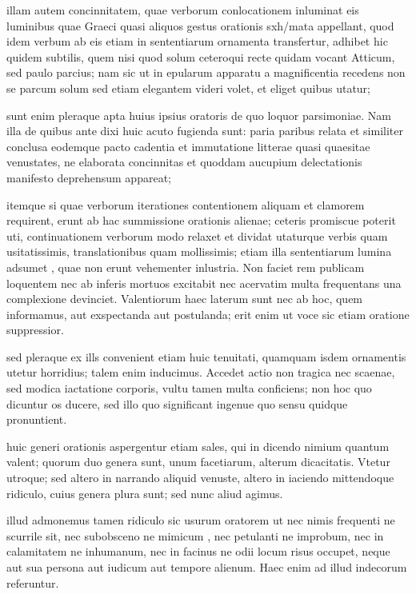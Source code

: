  illam autem concinnitatem, quae verborum conlocationem inluminat eis luminibus quae Graeci quasi aliquos gestus orationis sxh/mata appellant, quod idem verbum ab eis etiam in sententiarum ornamenta transfertur, adhibet hic quidem subtilis, quem nisi quod solum ceteroqui recte quidam vocant Atticum, sed paulo parcius; nam sic ut in epularum apparatu a magnificentia recedens non se parcum solum sed etiam elegantem videri volet, et eliget quibus utatur;

 sunt enim pleraque apta huius ipsius oratoris de quo loquor parsimoniae. Nam illa de quibus ante dixi huic acuto fugienda sunt: paria paribus relata et similiter conclusa eodemque pacto cadentia et immutatione litterae quasi quaesitae venustates, ne elaborata concinnitas et quoddam aucupium delectationis manifesto deprehensum appareat;

 itemque si quae verborum iterationes contentionem aliquam et clamorem requirent, erunt ab hac summissione orationis alienae; ceteris promiscue poterit uti, continuationem verborum modo relaxet et dividat utaturque verbis quam usitatissimis, translationibus quam mollissimis; etiam illa sententiarum lumina adsumet , quae non erunt vehementer inlustria. Non faciet rem publicam loquentem nec ab inferis mortuos excitabit nec acervatim multa frequentans una complexione devinciet. Valentiorum haec laterum sunt nec ab hoc, quem informamus, aut exspectanda aut postulanda; erit enim ut voce sic etiam oratione suppressior.

 sed pleraque ex ills convenient etiam huic tenuitati, quamquam isdem ornamentis utetur horridius; talem enim inducimus. Accedet actio non tragica nec scaenae, sed modica iactatione corporis, vultu tamen multa conficiens; non hoc quo dicuntur os ducere, sed illo quo significant ingenue quo sensu quidque pronuntient.

 huic generi orationis aspergentur etiam sales, qui in dicendo nimium quantum valent; quorum duo genera sunt, unum facetiarum, alterum dicacitatis. Vtetur utroque; sed altero in narrando aliquid venuste, altero in iaciendo mittendoque ridiculo, cuius genera plura sunt; sed nunc aliud agimus.

 illud admonemus tamen ridiculo sic usurum oratorem ut nec nimis frequenti ne scurrile sit, nec subobsceno ne mimicum , nec petulanti ne improbum, nec in calamitatem ne inhumanum, nec in facinus ne odii locum risus occupet, neque aut sua persona aut iudicum aut tempore alienum. Haec enim ad illud indecorum referuntur.

